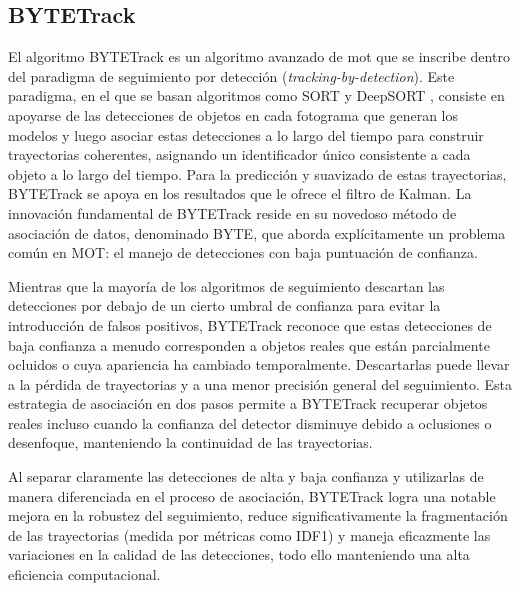 \documentclass[11pt,spanish,listoffigures,listoftables]{tfgetsinf}
\begin{document}
\subsection{BYTETrack}\label{sec:bytetrack}

El algoritmo BYTETrack \cite{zhang2022bytetrackmultiobjecttrackingassociating} es un algoritmo avanzado de \gls{mot} que se inscribe dentro del paradigma de seguimiento por detección (\textit{tracking-by-detection}). Este paradigma, en el que se basan algoritmos como SORT \cite{Bewley_2016} y DeepSORT \cite{wojke2017simpleonlinerealtimetracking}, consiste en apoyarse de las detecciones de objetos en cada fotograma que generan los modelos y luego asociar estas detecciones a lo largo del tiempo para construir trayectorias coherentes, asignando un identificador único consistente a cada objeto a lo largo del tiempo. Para la predicción y suavizado de estas trayectorias, BYTETrack se apoya en los resultados que le ofrece el filtro de Kalman. La innovación fundamental de BYTETrack reside en su novedoso método de asociación de datos, denominado BYTE, que aborda explícitamente un problema común en MOT: el manejo de detecciones con baja puntuación de confianza.

Mientras que la mayoría de los algoritmos de seguimiento descartan las detecciones por debajo de un cierto umbral de confianza para evitar la introducción de falsos positivos, BYTETrack reconoce que estas detecciones de baja confianza a menudo corresponden a objetos reales que están parcialmente ocluidos o cuya apariencia ha cambiado temporalmente. Descartarlas puede llevar a la pérdida de trayectorias y a una menor precisión general del seguimiento. Esta estrategia de asociación en dos pasos permite a BYTETrack recuperar objetos reales incluso cuando la confianza del detector disminuye debido a oclusiones o desenfoque, manteniendo la continuidad de las trayectorias. 

Al separar claramente las detecciones de alta y baja confianza y utilizarlas de manera diferenciada en el proceso de asociación, BYTETrack logra una notable mejora en la robustez del seguimiento, reduce significativamente la fragmentación de las trayectorias (medida por métricas como IDF1) y maneja eficazmente las variaciones en la calidad de las detecciones, todo ello manteniendo una alta eficiencia computacional.
\end{document}
